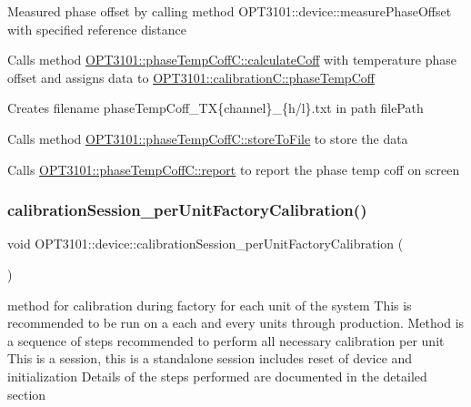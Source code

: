 \begin{DoxyItemize}
\item Measured phase offset by calling method O\+P\+T3101\+::device\+::measure\+Phase\+Offset with specified reference distance
\item Calls method \mbox{\hyperlink{class_o_p_t3101_1_1phase_temp_coff_c_a6a9ce25c87c81782b999e28c0a63a6af}{O\+P\+T3101\+::phase\+Temp\+Coff\+C\+::calculate\+Coff}} with temperature phase offset and assigns data to \mbox{\hyperlink{class_o_p_t3101_1_1calibration_c_a277a7bbf506f5f5181719311d10bc610}{O\+P\+T3101\+::calibration\+C\+::phase\+Temp\+Coff}}
\item Creates filename phase\+Temp\+Coff\+\_\+\+TX\{channel\}\+\_\+\{h/l\}.txt in path file\+Path
\item Calls method \mbox{\hyperlink{class_o_p_t3101_1_1phase_temp_coff_c_a05f0376e59830c4c81b37dc2042237e6}{O\+P\+T3101\+::phase\+Temp\+Coff\+C\+::store\+To\+File}} to store the data ~\newline

\item Calls \mbox{\hyperlink{class_o_p_t3101_1_1phase_temp_coff_c_af41bc218f81c9bfe8ae00e0bc6a64f4f}{O\+P\+T3101\+::phase\+Temp\+Coff\+C\+::report}} to report the phase temp coff on screen 
\end{DoxyItemize}\mbox{\label{class_o_p_t3101_1_1device_abad5b2d7405e735fa80041dbbf47502c}} 
\subsubsection{\texorpdfstring{calibration\+Session\+\_\+per\+Unit\+Factory\+Calibration()}{calibrationSession\_perUnitFactoryCalibration()}}
{\footnotesize\ttfamily void O\+P\+T3101\+::device\+::calibration\+Session\+\_\+per\+Unit\+Factory\+Calibration (\begin{DoxyParamCaption}{ }\end{DoxyParamCaption})}



method for calibration during factory for each unit of the system This is recommended to be run on a each and every units through production. Method is a sequence of steps recommended to perform all necessary calibration per unit This is a session, this is a standalone session includes reset of device and initialization Details of the steps performed are documented in the detailed section 

